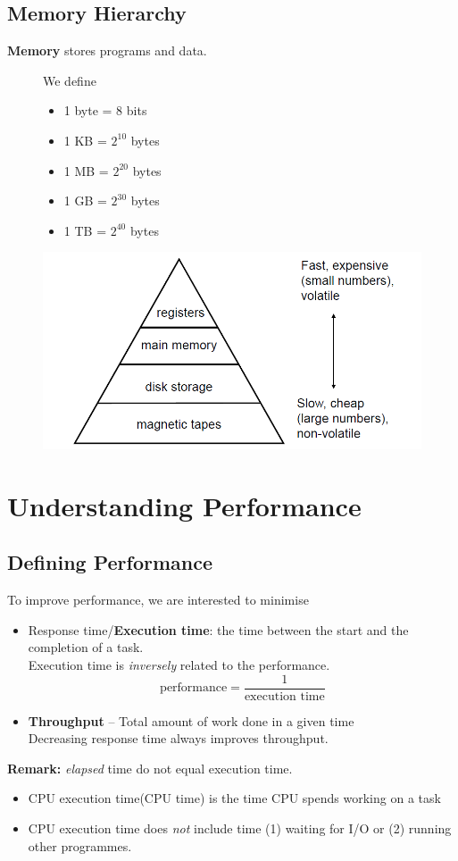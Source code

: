 \documentclass[12pt]{article}
\theoremstyle{definition}
\begin{document}
\subsection{Memory Hierarchy}
\textbf{Memory} stores programs and data.\\
\begin{figure}[h]
\begin{minipage}{0.4\textwidth}
We define
\begin{itemize}
  \item 1 byte = 8 bits
  \item 1 KB = $2^{10}$ bytes
  \item 1 MB = $2^{20}$ bytes
  \item 1 GB = $2^{30}$ bytes
  \item 1 TB = $2^{40}$ bytes
\end{itemize}
\end{minipage}\hfill
\begin{minipage}{0.5\textwidth}
\centering
\includegraphics[width = \textwidth]{8_14.png}
\end{minipage}\end{figure}
\clearpage
\section{Understanding Performance}
\subsection{Defining Performance}
To improve performance, we are interested to minimise
\begin{itemize}
  \item Response time/\textbf{Execution time}: the time between the start and the completion of a task.\\
  Execution time is \textit{inversely} related to the performance.
  \[
\text{performance} = \frac{1}{\text{execution time}}
  \] 
  \item \textbf{Throughput} -- Total amount of work done in a given time\\
  Decreasing response time always improves throughput.
\end{itemize}
\textbf{Remark:} \textit{elapsed} time do not equal execution time.
\begin{itemize}
  \item CPU execution time(CPU time) is the time CPU spends working on a task
  \item CPU execution time does \textit{not} include time (1) waiting for I/O or (2) running other programmes.
\end{itemize}
\end{document}
